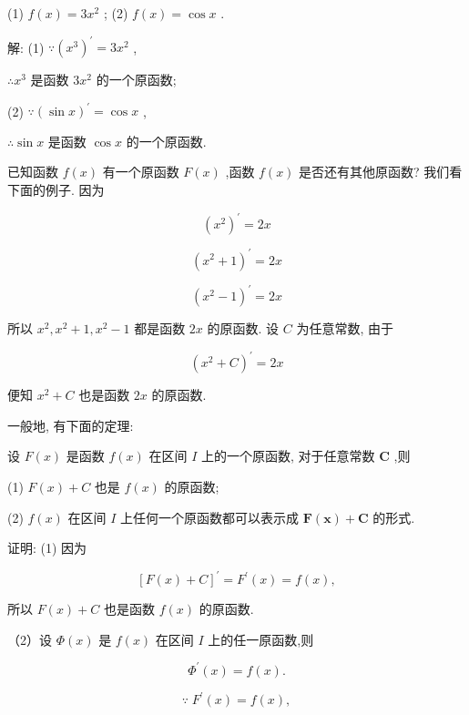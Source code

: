 \documentclass[lang=cn,newtx,10pt,scheme=chinese]{elegantbook}
\begin{document}
(1) \(f\left( x\right) = 3{x}^{2}\) ; (2) \(f\left( x\right) = \cos x\) .

解: (1) \(\because {\left( {x}^{3}\right) }^{\prime } = 3{x}^{2}\) ,

\(\therefore {x}^{3}\) 是函数 \(3{x}^{2}\) 的一个原函数;

(2) \(\because {\left( \sin x\right) }^{\prime } = \cos x\) ,

\(\therefore \sin x\) 是函数 \(\cos x\) 的一个原函数.

已知函数 \(f\left( x\right)\) 有一个原函数 \(F\left( x\right)\) ,函数 \(f\left( x\right)\) 是否还有其他原函数? 我们看下面的例子. 因为

\[
{\left( {x}^{2}\right) }^{\prime } = {2x}
\]

\[
{\left( {x}^{2} + 1\right) }^{\prime } = {2x}
\]

\[
{\left( {x}^{2} - 1\right) }^{\prime } = {2x}
\]

所以 \({x}^{2},{x}^{2} + 1,{x}^{2} - 1\) 都是函数 \({2x}\) 的原函数. 设 \(C\) 为任意常数, 由于

\[
{\left( {x}^{2} + C\right) }^{\prime } = {2x}
\]

便知 \({x}^{2} + C\) 也是函数 \({2x}\) 的原函数.

一般地, 有下面的定理:

\begin{theorem}[定理]

设 \(F\left( x\right)\) 是函数 \(f\left( x\right)\) 在区间 \(I\) 上的一个原函数, 对于任意常数 \(\mathbf{C}\) ,则

(1) \(F\left( x\right) + C\) 也是 \(f\left( x\right)\) 的原函数;

(2) \(f\left( x\right)\) 在区间 \(I\) 上任何一个原函数都可以表示成 \(\mathbf{F}\left( \mathbf{x}\right) + \mathbf{C}\) 的形式.

\end{theorem}

证明: (1) 因为

\[
{\left\lbrack F\left( x\right) + C\right\rbrack }^{\prime } = {F}^{\prime }\left( x\right) = f\left( x\right) ,
\]

所以 \(F\left( x\right) + C\) 也是函数 \(f\left( x\right)\) 的原函数.

（2）设 \(\Phi \left( x\right)\) 是 \(f\left( x\right)\) 在区间 \(I\) 上的任一原函数,则

\[
{\Phi }^{\prime }\left( x\right) = f\left( x\right) .
\]

\[
\because \;{F}^{\prime }\left( x\right) = f\left( x\right) ,
\]
\end{document}
